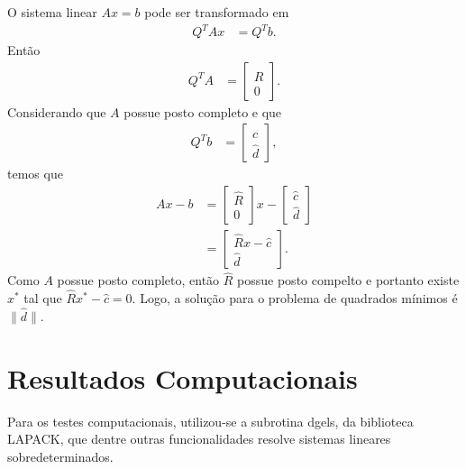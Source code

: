 \documentclass[12pt,a4paper]{article}
\begin{document}
O sistema linear $A x = b$ pode ser transformado em
\begin{align*}
    Q^T A x &= Q^T b.
\end{align*}
Então
\begin{align*}
    Q^T A &= \begin{bmatrix}
        \hat{R} \\
        0
    \end{bmatrix}.
\end{align*}
Considerando que $A$ possue posto completo e que
\begin{align*}
    Q^T b &= \begin{bmatrix}
        \hat{c} \\
        \hat{d}
    \end{bmatrix},
\end{align*}
temos que
\begin{align*}
    A x - b &= \begin{bmatrix}
        \hat{R} \\
        0
    \end{bmatrix} x - \begin{bmatrix}
        \hat{c} \\
        \hat{d}
    \end{bmatrix} \\
    &= \begin{bmatrix}
        \hat{R} x - \hat{c} \\
        \hat{d}
    \end{bmatrix}.
\end{align*}
Como $A$ possue posto completo, então $\hat{R}$ possue posto compelto e
portanto existe $x^*$ tal que $\hat{R} x^* - \hat{c} = 0$. Logo, a
solução para o problema de quadrados mínimos é $\| \hat{d} \|$.

\section{Resultados Computacionais}
Para os testes computacionais, utilizou-se a subrotina dgels, da
biblioteca LAPACK, que dentre outras funcionalidades resolve sistemas
lineares sobredeterminados.
\end{document}
